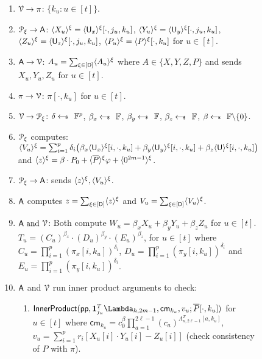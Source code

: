 \begin{figure*}[h]
{\begin{framed}
\begin{enumerate}[{\rm 1.}]
				\item $\verifier\rightarrow\pi$: $\{k_u:u\in [t]\}$.
				\item $\distprover\rightarrow\Ag$:
				$\shr{X_u}=\shr{\ewit_x}[\cdot,j_u,k_u]$,
				$\shr{Y_u}=\shr{\ewit_y}[\cdot,j_u,k_u]$,
				$\shr{Z_u}=\shr{\ewit_z}[\cdot,j_u,k_u]$,
				$\shr{P_u} = \shr{P}[\cdot,k_u]$
				for $u\in [t]$.
				\item  {$\Ag\rightarrow\verifier$: $A_u = \sum_{\xi\in[\Num]} \shr{A_u}$ where $A\in \{X, Y, Z, P\}$ and sends ${X_u, Y_u, Z_u}$ for $u\in [t]$.}
				\item $\pi\rightarrow\verifier$: $\pi[\cdot,k_u]$ for $u\in [t]$.
				\item $\verifier\rightarrow\distprover$: $\delta\sample \FF^p$, $\beta_x\sample \FF$, $\beta_y\sample \FF$, $\beta_z\sample \FF$,
				$\beta\sample \FF\backslash \{0\}$. 
				\item $\distprover$ computes:$\shr{V_u} = \sum_{i=1}^p \delta_i \big( \beta_x \shr{\ewit_x} [i,\cdot,k_u] + \beta_y \shr{\ewit_y} [i,\cdot,k_u] + \beta_z \shr{\ewit}[i,\cdot,k_u] \big)$ and $\shr{z} =  \beta\cdot P_0 + \shr{\overline{P}}\varphi + \shr{0^{2m-1}}$.
				\item $\distprover\rightarrow\Ag$:  sends $\shr{z}, \shr{V_u}$.
				\item  {$\Ag$ computes $z=\sum_{\xi\in[\Num]} \shr{z}$} and $V_u = \sum_{\xi\in[\Num]} \shr{V_u}$.
				\item $\Ag \text{ and } \verifier$: Both compute $W_u = \beta_x X_u + \beta_y Y_u + \beta_z Z_u$ for $u\in[t]$. $T_u = (C_u)^{\beta_x} \cdot(D_u)^{\beta_y} \cdot (E_u)^{\beta_z}$, for $u\in [t]$ where $C_u = \prod_{i=1}^{p} (\pi_x[i,k_u])^{\delta_i}$, $D_u = \prod_{i=1}^{p} (\pi_y[i,k_u])^{\delta_i}$
				and $E_u=\prod_{i=1}^{p}(\pi_y[i,k_u])^{\delta_i}$.
				\item $\Ag$ and $\verifier$ run inner product arguments to check:
				\begin{enumerate}
					\item $\innerproduct(\mathsf{pp},\bm{1}_{j_u}^T\Lambda_{h,2m-1},\mathsf{cm}_{k_u},v_u;\overline{P}[\cdot,k_u])$ for $u\in [t]$ where $\mathsf{cm}_{k_u} = c_0^{\beta}\prod_{a=1}^{2\ell-1}(c_a)^{\Lambda_{n,2\ell-1}^T[a,k_u]}$, $v_u=\sum_{i=1}^p r_i[X_u[i] \cdot Y_u[i] - Z_u[i]]$ (check consistency of $P$ with $\pi$).

\end{enumerate}
\end{enumerate}
\end{framed}}
\end{figure*}
